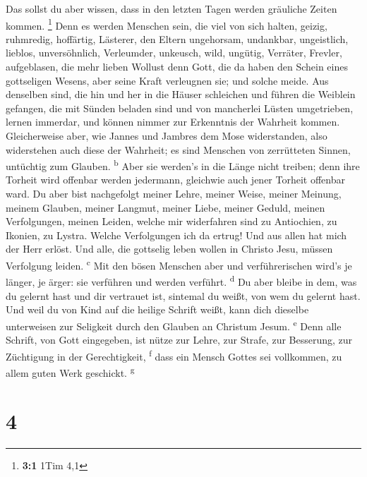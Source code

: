  Das sollst du aber wissen, dass in den letzten Tagen
werden gräuliche Zeiten kommen. \footnote{\textbf{3:1} 1Tim 4,1}
 Denn es werden Menschen sein, die viel von sich halten,
geizig, ruhmredig, hoffärtig, Lästerer, den Eltern ungehorsam,
undankbar, ungeistlich,  lieblos, unversöhnlich,
Verleumder, unkeusch, wild, ungütig,  Verräter, Frevler,
aufgeblasen, die mehr lieben Wollust denn Gott,  die da
haben den Schein eines gottseligen Wesens, aber seine Kraft verleugnen
sie; und solche meide.  Aus denselben sind, die hin und
her in die Häuser schleichen und führen die Weiblein gefangen, die mit
Sünden beladen sind und von mancherlei Lüsten umgetrieben,
 lernen immerdar, und können nimmer zur Erkenntnis der
Wahrheit kommen.  Gleicherweise aber, wie Jannes und
Jambres dem Mose widerstanden, also widerstehen auch diese der Wahrheit;
es sind Menschen von zerrütteten Sinnen, untüchtig zum Glauben.
\textsuperscript{b}  Aber sie werden's in die Länge nicht
treiben; denn ihre Torheit wird offenbar werden jedermann, gleichwie
auch jener Torheit offenbar ward.  Du aber bist
nachgefolgt meiner Lehre, meiner Weise, meiner Meinung, meinem Glauben,
meiner Langmut, meiner Liebe, meiner Geduld,  meinen
Verfolgungen, meinen Leiden, welche mir widerfahren sind zu Antiochien,
zu Ikonien, zu Lystra. Welche Verfolgungen ich da ertrug! Und aus allen
hat mich der Herr erlöst.  Und alle, die gottselig leben
wollen in Christo Jesu, müssen Verfolgung leiden. \textsuperscript{c}
 Mit den bösen Menschen aber und verführerischen wird's
je länger, je ärger: sie verführen und werden verführt.
\textsuperscript{d}  Du aber bleibe in dem, was du
gelernt hast und dir vertrauet ist, sintemal du weißt, von wem du
gelernt hast.  Und weil du von Kind auf die heilige
Schrift weißt, kann dich dieselbe unterweisen zur Seligkeit durch den
Glauben an Christum Jesum. \textsuperscript{e}  Denn alle
Schrift, von Gott eingegeben, ist nütze zur Lehre, zur Strafe, zur
Besserung, zur Züchtigung in der Gerechtigkeit, \textsuperscript{f}
 dass ein Mensch Gottes sei vollkommen, zu allem guten
Werk geschickt. \textsuperscript{g}

\hypertarget{section-3}{%
\section{4}\label{section-3}}

